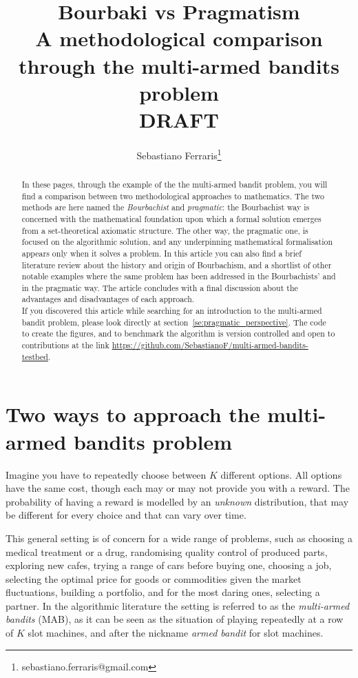 \documentclass[]{scrartcl}
\title{Bourbaki vs Pragmatism \\ A methodological comparison through the multi-armed bandits problem
 \\
 DRAFT
}
\author{Sebastiano Ferraris\footnote{sebastiano.ferraris@gmail.com}}
\theoremstyle{definition}
\begin{document}
\maketitle

\begin{abstract}
    In these pages, through the example of the the multi-armed bandit problem, you will find a comparison between two methodological approaches to mathematics.
    The two methods are here named the \emph{Bourbachist} and \emph{pragmatic}: the Bourbachist way is concerned with the mathematical foundation upon which a formal solution emerges from a set-theoretical axiomatic structure. The other way, the pragmatic one, is focused on the algorithmic solution, and any underpinning mathematical formalisation appears only when it solves a problem.
    In this article you can also find a brief literature review about the history and origin of Bourbachism, and a shortlist of other notable examples where the same problem has been addressed in the Bourbachists' and in the pragmatic way. The article concludes with a final discussion about the advantages and disadvantages of each approach. \\

\noindent
If you discovered this article while searching for an introduction to the multi-armed bandit problem, please look directly at section~\ref{se:pragmatic_perspective}. The code to create the figures, and to benchmark the algorithm is version controlled and open to contributions at the link \href{https://github.com/SebastianoF/multi-armed-bandits-testbed}{https://github.com/SebastianoF/multi-armed-bandits-testbed}.
\end{abstract}


\section{Two ways to approach the multi-armed bandits problem}
\label{se:intro}
Imagine you have to repeatedly choose between $K$ different options. All options have the same cost, though each may or may not provide you with a reward. The probability of having a reward is modelled by an \emph{unknown} distribution, that may be different for every choice and that can vary over time.

This general setting is of concern for a wide range of problems, such as choosing a medical treatment or a drug, randomising quality control of produced parts, exploring new cafes, trying a range of cars before buying one, choosing a job, selecting the optimal price for goods or commodities given the market fluctuations, building a portfolio, and for the most daring ones, selecting a partner. In the algorithmic literature the setting is referred to as the \emph{multi-armed bandits} (MAB), as it can be seen as the situation of playing repeatedly at a row of $K$ slot machines, and after the nickname \emph{armed bandit} for slot machines.
\end{document}
